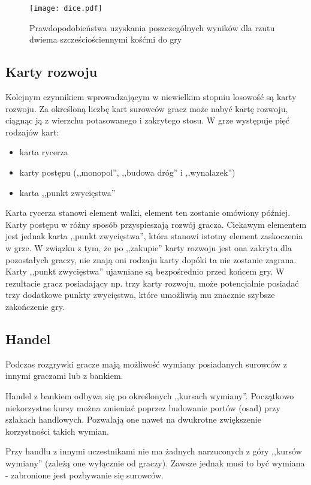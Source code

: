 \documentclass[11pt,twoside]{report}
\begin{document}
\begin{figure}[ht]
  \begin{center}
    \texttt{[image: dice.pdf]}
  \end{center}
  \caption{Prawdopodobieństwa uzyskania poszczególnych wyników dla
    rzutu dwiema szcześciościennymi kośćmi do gry}
  \label{dice}
\end{figure}

\subsection{Karty rozwoju}
Kolejnym czynnikiem wprowadzającym w niewielkim stopniu losowość są
karty rozwoju. Za określoną liczbę kart surowców gracz może nabyć
kartę rozwoju, ciągnąc ją z wierzchu potasowanego i zakrytego stosu. W
grze występuje pięć rodzajów kart:

\begin{itemize}
\item karta rycerza
\item karty postępu (,,monopol'', ,,budowa dróg'' i ,,wynalazek'')
\item karta ,,punkt zwycięstwa''
\end{itemize}

Karta rycerza stanowi element walki, element ten zostanie omówiony
później. Karty postępu w różny sposób przyspieszają rozwój
gracza. Ciekawym elementem jest jednak karta ,,punkt zwycięstwa'',
która stanowi istotny element zaskoczenia w grze. W związku z tym, że
po ,,zakupie'' karty rozwoju jest ona zakryta dla pozostałych graczy,
nie znają oni rodzaju karty dopóki ta nie zostanie zagrana. Karty
,,punkt zwycięstwa'' ujawniane są bezpośrednio przed końcem gry. W
rezultacie gracz posiadający np. trzy karty rozwoju, może potencjalnie
posiadać trzy dodatkowe punkty zwycięstwa, które umożliwią mu znacznie
szybsze zakończenie gry.

\subsection{Handel}
Podczas rozgrywki gracze mają możliwość wymiany posiadanych surowców z
innymi graczami lub z bankiem.

Handel z bankiem odbywa się po określonych ,,kursach
wymiany''. Początkowo niekorzystne kursy można zmieniać poprzez
budowanie portów (osad) przy szlakach handlowych. Pozwalają one nawet
na dwukrotne zwiększenie korzystności takich wymian.

Przy handlu z innymi uczestnikami nie ma żadnych narzuconych z góry
,,kursów wymiany'' (zależą one wyłącznie od graczy). Zawsze jednak
musi to być wymiana - zabronione jest pozbywanie się surowców.
\end{document}
